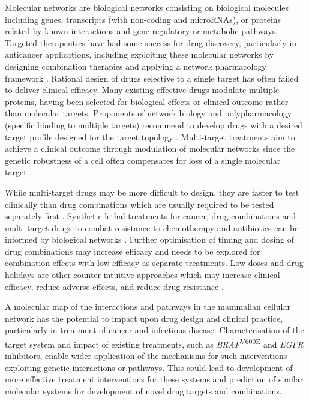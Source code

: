 Molecular networks are biological networks consisting on biological molecules including genes, transcripts (with non-coding and microRNAs), or proteins related by known interactions and gene regulatory or metabolic pathways. Targeted therapeutics have had some success for drug discovery, particularly in anticancer applications, including exploiting these molecular networks by designing combination therapies and applying a network pharmacology framework \citet{Hopkins2008}. Rational design of drugs selective to a single target has often failed to deliver clinical efficacy. Many existing effective drugs modulate multiple proteins, having been selected for biological effects or clinical outcome rather than molecular targets. Proponents of network biology and polypharmacology (specific binding to multiple targets) recommend to develop drugs with a desired target profile designed for the target topology \citet{Hopkins2008, Barabasi2004}. Multi-target treatments aim to achieve a clinical outcome through modulation of molecular networks since the genetic robustness of a cell often compensates for loss of a single molecular target.  

While multi-target drugs may be more difficult to design, they are faster to test clinically than drug combinations which are usually required to be tested separately first \citet{Hopkins2008}. Synthetic lethal treatments for cancer, drug combinations and multi-target drugs to combat resistance to chemotherapy and antibiotics can be informed by biological networks \citet{Hopkins2008, Barabasi2004}. Further optimisation of timing and dosing of drug combinations may increase efficacy and needs to be explored for combination effects with low efficacy as separate treatments. Low doses and drug holidays are other counter intuitive approaches which may increase clinical efficacy, reduce adverse effects, and reduce drug resistance \citep{Sun2014, Tsai2012}.  

A molecular map of the interactions and pathways in the mammalian cellular network has the potential to impact upon drug design and clinical practice, particularly in treatment of cancer and infectious disease. Characterisation of the target system and impact of existing treatments, such as  \textit{BRAF}\textsuperscript{V600E} and \textit{EGFR} inhibitors, enable wider application of the mechanisms for such interventions exploiting genetic interactions or pathways. This could lead to development of more effective treatment interventions for these systems and prediction of similar molecular systems for development of novel drug targets and combinations.  


